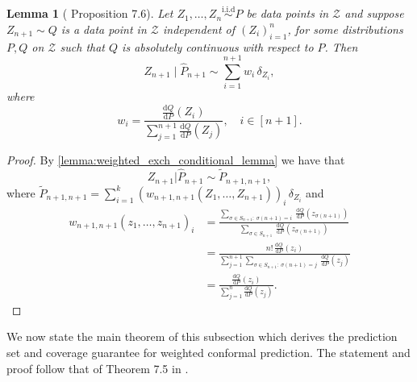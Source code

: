 \documentclass[11pt, titlepage]{article} %
\newcommand{\R}{\mathrm}
\numberwithin{equation}{section}
\newtheorem{lemma}{Lemma}
\theoremstyle{definition}
\numberwithin{theorem}{section}
\numberwithin{lemma}{section}
\numberwithin{corollary}{section}
\numberwithin{proposition}{section}
\numberwithin{definition}{section}
\numberwithin{remark}{section}
\begin{document}
\begin{lemma}[\cite{angelopoulos2024theoreticalfoundationsconformalprediction} Proposition 7.6]
    Let \(Z_1, \ldots, Z_n \overset{\R{i.i.d}}{\sim} P \) be data points in \(\mathcal{Z}\) and suppose \(Z_{n+1} \sim Q\) is a data point in \(\mathcal{Z}\) independent of \((Z_i)_{i=1}^n\), for some distributions \(P, Q\) on \(\mathcal{Z}\) such that \(Q\) is absolutely continuous with respect to \(P\). Then \[Z_{n+1} \mid \hat{P}_{n+1} \sim \sum_{i=1}^{n+1} w_i \, \delta_{Z_i},\] where \[
        w_i = \frac{ \frac{\R{d}Q}{\R{d}P}(Z_i)  }{ \sum_{j=1}^{n+1}  \frac{\R{d}Q}{\R{d}P}(Z_j) }, \quad i \in [n+1].
    \]
\label{lemma:dist_shift_empirical_dist}
\end{lemma}
\begin{proof}
    By \cref{lemma:weighted_exch_conditional_lemma} we have that \[Z_{n+1} | \hat{P}_{n+1} \sim \tilde{P}_{n+1, n+1},\] where \(\tilde{P}_{n+1, n+1} = \sum_{i=1}^{k} \left(w_{n+1, n+1}(Z_1, \ldots, Z_{n+1})\right)_i \, \delta_{Z_i}\) and \begin{align*}
        w_{n+1, n+1}(z_1, \ldots, z_{n+1})_i &= 
        \frac{\sum_{\sigma \in S_{n+1}: \ \sigma(n+1) = i} \ \frac{\R{d}Q}{\R{d}P}(z_{\sigma(n+1)}) }{\sum_{\sigma \in S_{n+1}} \, \frac{\R{d}Q}{\R{d}P}(z_{\sigma(n+1)}) } \\
        &= \frac{n! \, \frac{\R{d}Q}{\R{d}P}(z_i)}{\sum_{j=1}^{n+1} \sum_{\sigma \in S_{n+1}: \ \sigma(n+1)=j} \ \frac{\R{d}Q}{\R{d}P}(z_j) } \\
        &= \frac{\frac{\R{d}Q}{\R{d}P}(z_i)}{\sum_{j=1}^{n} \frac{\R{d}Q}{\R{d}P}(z_j)}.
    \end{align*}
\end{proof}

\noindent
We now state the main theorem of this subsection which derives the prediction set and coverage guarantee for weighted conformal prediction. The statement and proof follow that of Theorem 7.5 in \cite{angelopoulos2024theoreticalfoundationsconformalprediction}.
\end{document}
